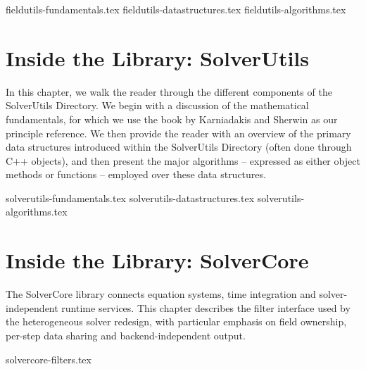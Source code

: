{fieldutils-fundamentals.tex}
%
{fieldutils-datastructures.tex}
%
{fieldutils-algorithms.tex}



\chapter{Inside the Library: SolverUtils}

In this chapter, we walk the reader through the different components of the SolverUtils Directory.
We begin with a discussion of the mathematical fundamentals, for which we use the book
by Karniadakis and Sherwin \cite{KaSh05} as our principle reference.  We then provide
the reader with an overview of the primary data structures introduced within the
SolverUtils Directory (often done through C++ objects), and then present the major
algorithms -- expressed as either object methods or functions -- employed over these data structures.

{solverutils-fundamentals.tex}
%
{solverutils-datastructures.tex}
%
{solverutils-algorithms.tex}


\chapter{Inside the Library: SolverCore}
\label{chap:solvercore}

The SolverCore library connects equation systems, time integration and
solver-independent runtime services. This chapter describes the filter
interface used by the heterogeneous solver redesign, with particular emphasis
on field ownership, per-step data sharing and backend-independent output.

{solvercore-filters.tex}

